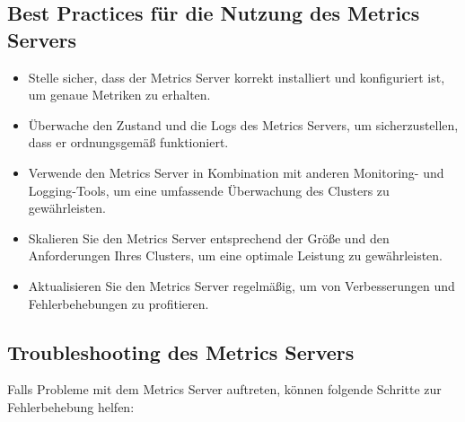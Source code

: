 \subsection{Best Practices für die Nutzung des Metrics Servers}
\begin{itemize}
    \item Stelle sicher, dass der Metrics Server korrekt installiert und konfiguriert ist, um genaue Metriken zu erhalten.
    \item Überwache den Zustand und die Logs des Metrics Servers, um sicherzustellen, dass er ordnungsgemäß funktioniert.
    \item Verwende den Metrics Server in Kombination mit anderen Monitoring- und Logging-Tools, um eine umfassende Überwachung des Clusters zu gewährleisten.
    \item Skalieren Sie den Metrics Server entsprechend der Größe und den Anforderungen Ihres Clusters, um eine optimale Leistung zu gewährleisten.
    \item Aktualisieren Sie den Metrics Server regelmäßig, um von Verbesserungen und Fehlerbehebungen zu profitieren.
\end{itemize}

\subsection{Troubleshooting des Metrics Servers}
Falls Probleme mit dem Metrics Server auftreten, können folgende Schritte zur Fehlerbehebung helfen:

